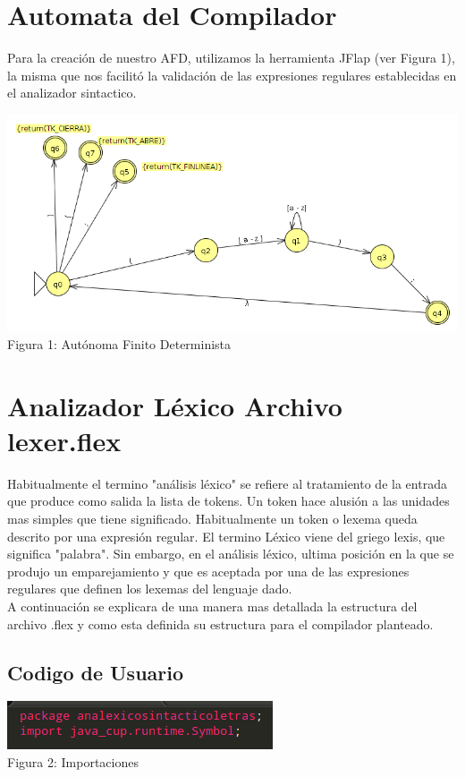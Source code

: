 \documentclass[a4paper,openright,12pt]{article}
\begin{document}
\section{Automata del Compilador}

Para la creación de nuestro AFD, utilizamos la herramienta JFlap (ver Figura 1), la misma que nos facilitó la validación de las expresiones regulares establecidas en el analizador sintactico.
\begin{center}
\includegraphics[height=0.37\textheight]{automata.png}
Figura 1: Autónoma Finito Determinista
\end{center}
\section{Analizador Léxico Archivo lexer.flex}

Habitualmente el termino "análisis léxico" se refiere al tratamiento de la entrada que produce como salida la lista de tokens. Un token hace alusión a las unidades mas simples que tiene significado. Habitualmente un token o lexema queda descrito por una expresión regular. El termino Léxico viene del griego lexis, que significa "palabra". Sin embargo, en el análisis léxico, ultima posición en la que se produjo un emparejamiento y que es aceptada por una de las expresiones regulares que definen los lexemas del lenguaje dado.\cite{1}\\

A continuación se explicara de una manera mas detallada la estructura del archivo .flex y como esta
definida su estructura para el compilador planteado.

\subsection{Codigo de Usuario}

\begin{center}
\includegraphics[height=0.05\textheight]{usuario.png}
\\
Figura 2: Importaciones
\end{center}
\end{document}

